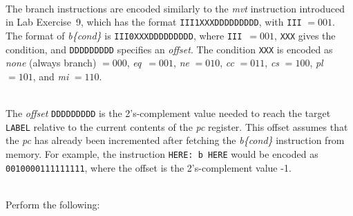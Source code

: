 \documentclass[epsfig,10pt,fullpage]{article} \addtolength{\textwidth}{1.5in}
\begin{document}
~\\
\noindent
The branch instructions are encoded similarly to the {\it mvt} instruction introduced
in Lab Exercise~9, which has the format \texttt{III1XXXDDDDDDDDD}, with \texttt{III} $= 001$.
The format of {\it b\{cond\}} is \texttt{III0XXXDDDDDDDDD}, where \texttt{III}~$= 001$,
\texttt{XXX} gives the condition, and \texttt{DDDDDDDDD} specifies an {\it offset}.
The condition \texttt{XXX} is encoded
as {\it none} (always branch) $= 000$, {\it eq}~$= 001$, {\it ne} $= 010$, {\it cc} $= 011$, 
{\it cs} $= 100$, {\it pl} $= 101$, and {\it mi} $= 110$.

~\\
\noindent
The {\it offset} \texttt{DDDDDDDDD} is the 2's-complement value
needed to reach the target \texttt{LABEL} relative to the current contents of the {\it pc}
register.  This offset assumes that the {\it pc} has already been incremented after fetching the 
{\it b\{cond\}} instruction from memory. For example, the instruction \texttt{HERE: b HERE} 
would be encoded as \texttt{0010000111111111}, where the offset is the 2's-complement value -1.

~\\
\noindent
Perform the following:
\end{document}
